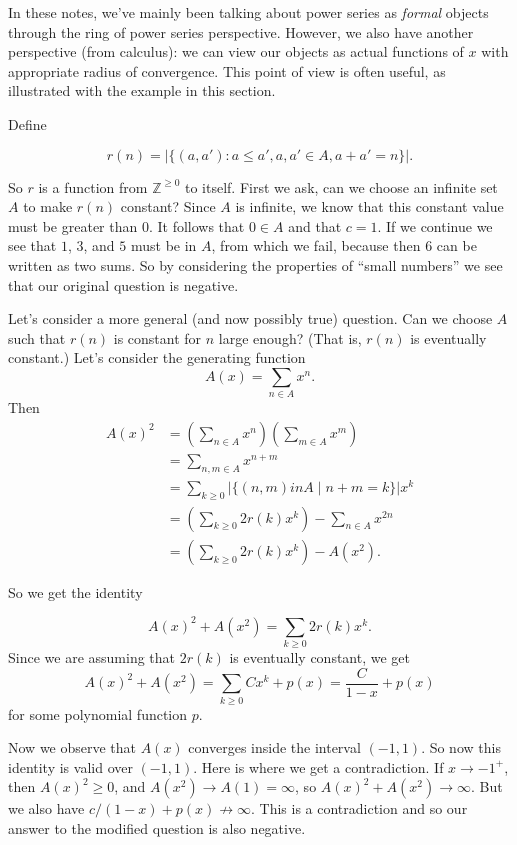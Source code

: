 In these notes, we've mainly been talking about power series as \textit{formal} objects through the ring of power series perspective. However, we also have another perspective (from calculus): we can view our objects as actual functions of $x$ with appropriate radius of convergence. This point of view is often useful, as illustrated with the example in this section.

Define

\[r(n) = |\{(a, a'): a \leq a', a, a' \in A, a + a' = n\}|.\]

So $r$ is a function from $\mathbb{Z}^{\geq 0}$ to itself. First we ask, can we choose an infinite set $A$ to make $r(n)$ constant? Since $A$ is infinite, we know that this constant value must be greater than $0$. It follows that $0 \in A$ and that $c = 1$. If we continue we see that $1$, $3$, and $5$ must be in $A$, from which we fail, because then $6$ can be written as two sums. So by considering the properties of ``small numbers'' we see that our original question is negative.

Let's consider a more general (and now possibly true) question. Can we choose $A$ such that $r(n)$ is constant for $n$ large enough? (That is, $r(n)$ is eventually constant.) Let's consider the generating function 
\[A(x) = \sum_{n \in A}x^n.\]
Then
\begin{align*}
A(x)^2 &= \left(\sum_{n \in A}x^n\right)\left(\sum_{m \in A}x^m\right) \\
&= \sum_{n, m \in A}x^{n + m} \\
&= \sum_{k \geq 0}|\{(n, m) in A \mid n + m = k\}|x^k \\
&= \left(\sum_{k \geq 0}2r(k)x^k\right) - \sum_{n \in A}x^{2n} \\
&= \left(\sum_{k \geq 0}2r(k)x^k\right) - A(x^2).
\end{align*}

So we get the identity

\[A(x)^2 + A(x^2) = \sum_{k \geq 0}2r(k)x^k.\]
Since we are assuming that $2r(k)$ is eventually constant, we get
\[A(x)^2 + A(x^2) = \sum_{k \geq 0}Cx^k + p(x) = \frac{C}{1-x} + p(x)\] for some polynomial function $p$.

Now we observe that $A(x)$ converges inside the interval $(-1, 1)$. So now this identity is valid over $(-1, 1)$. Here is where we get a contradiction. If $x \to -1^+$, then $A(x)^2 \geq 0$, and $A(x^2) \to A(1) = \infty$, so $A(x)^2 + A(x^2) \to \infty$. But we also have $c/(1 - x) + p(x)  \not\to \infty$. This is a contradiction and so our answer to the modified question is also negative. 